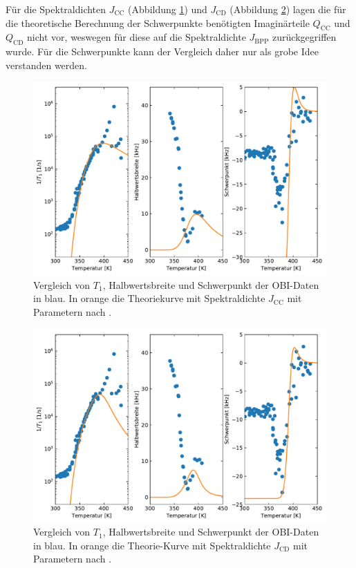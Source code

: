 Für die Spektraldichten $J_\text{CC}$ (Abbildung \ref{fig:res:theorie_j_cc}) und $J_\text{CD}$ (Abbildung \ref{fig:res:theorie_j_dc}) lagen die für die theoretische Berechnung der Schwerpunkte benötigten Imaginärteile $Q_\text{CC}$ und $Q_\text{CD}$ nicht vor, weswegen für diese auf die Spektraldichte $J_\text{BPP}$ zurückgegriffen wurde. Für die Schwerpunkte kann der Vergleich daher nur als grobe Idee verstanden werden.
\begin{figure}
	\begin{center}
		\includegraphics[width=.8\textwidth]{graphics/plot/OBI_J_cc_01.pdf}
	\end{center}
	\caption{Vergleich von $T_1$, Halbwertsbreite und Schwerpunkt der OBI-Daten in blau. In orange die Theoriekurve mit Spektraldichte $J_\text{CC}$ mit Parametern nach \cite{PIMENOV199793}.} \label{fig:res:theorie_j_cc}
\end{figure}
\begin{figure}
	\begin{center}
		\includegraphics[width=.8\textwidth]{graphics/plot/OBI_J_dc_01.pdf}
	\end{center}
	\caption{Vergleich von $T_1$, Halbwertsbreite und Schwerpunkt der OBI-Daten in blau. In orange die Theorie-Kurve mit Spektraldichte $J_\text{CD}$ mit Parametern nach \cite{PIMENOV199793}.} \label{fig:res:theorie_j_dc}
\end{figure}

